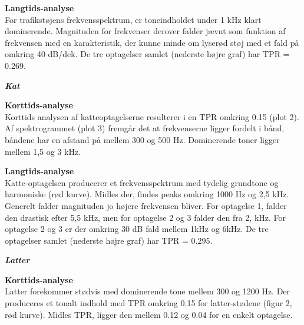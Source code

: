 
\newpage
\textbf{Langtids-analyse} \\
For trafikstøjens frekvensspektrum, er toneindholdet under 1 kHz klart dominerende. Magnituden for frekvenser derover falder jævnt som funktion af frekvensen med en karakteristik, der kunne minde om lyserød støj med et fald på omkring 40 dB/dek. De tre optagelser samlet (nederste højre graf) har TPR = 0.269.


\newpage
\begin{center}\textit{\textbf{Kat}}\end{center}
\textbf{Korttids-analyse} \\
Korttids analysen af katteoptagelserne resulterer i en TPR omkring 0.15 (plot 2). Af spektrogrammet (plot 3) fremgår det at frekvenserne ligger fordelt i bånd, båndene har en afstand på mellem 300 og 500 Hz. Dominerende toner ligger mellem 1,5 og 3 kHz.


\newpage
\textbf{Langtids-analyse} \\
Katte-optagelsen producerer et frekvensspektrum med tydelig grundtone og harmoniske (rød kurve). Midles der, findes peaks omkring 1000 Hz og 2,5 kHz. Generelt falder magnituden jo højere frekvensen bliver. For optagelse 1, falder den drastisk efter 5,5 kHz, men for optagelse 2 og 3 falder den fra 2, kHz. For optagelse 2 og 3 er der omkring 30 dB fald mellem 1kHz og 6kHz. De tre optagelser samlet (nederste højre graf) har TPR = 0.295.


\newpage
\begin{center}\textit{\textbf{Latter}}\end{center}
\textbf{Korttids-analyse} \\
Latter forekommer stødvis med dominerende tone mellem 300 og 1200 Hz. Der produceres et tonalt indhold med TPR omkring 0.15 for latter-stødene (figur 2, rød kurve). Midles TPR, ligger den mellem 0.12 og 0.04 for en enkelt optagelse.

